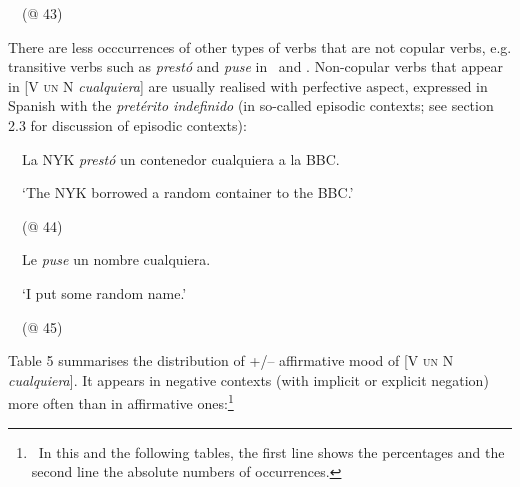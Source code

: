\begin{styleStandard}
\ \ (@ 43) 
\end{styleStandard}

\begin{styleStandard}
There are less occcurrences of other types of verbs that are not copular verbs, e.g. transitive verbs such as \textit{prestó} and \textit{puse} in \ and . Non-copular verbs that appear in [V \textsc{un} N \textit{cualquiera}] are usually realised with perfective aspect, expressed in Spanish with the \textit{pretérito indefinido} (in so-called episodic contexts; see section 2.3 for discussion of episodic contexts):
\end{styleStandard}

\begin{styleStandard}
\label{bkm:Ref42868870}\ \ La NYK \textit{prestó} un contenedor cualquiera a la BBC.
\end{styleStandard}

\begin{styleStandard}
\ \ ‘The NYK borrowed a random container to the BBC.’
\end{styleStandard}

\begin{styleStandard}
\ \ (@ 44)
\end{styleStandard}

\begin{styleStandard}
\label{bkm:Ref42869017}\ \ Le \textit{puse} un nombre cualquiera. 
\end{styleStandard}

\begin{styleStandard}
\ \ ‘I put some random name.’
\end{styleStandard}

\begin{styleStandard}
\ \ (@ 45)
\end{styleStandard}

\begin{styleStandard}
Table 5 summarises the distribution of +/– affirmative mood of [V \textsc{un} N \textit{cualquiera}]. It appears in negative contexts (with implicit or explicit negation) more often than in affirmative ones:\footnote{\ In this and the following tables, the first line shows the percentages and the second line the absolute numbers of occurrences.} 
\end{styleStandard}

